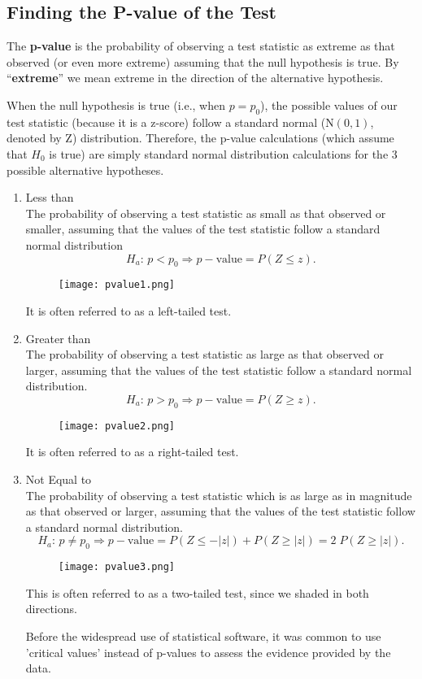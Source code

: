 \documentclass[10pt, a4paper]{article}
\begin{document}
\subsection{Finding the P-value of the Test}
The \textbf{p-value} is the probability of observing a test statistic as extreme as that observed (or even more extreme) assuming that the null hypothesis is true.
By ``\textbf{extreme}'' we mean extreme in the direction of the alternative hypothesis.\par
When the null hypothesis is true (i.e., when $p=p_0$), the possible values of our test statistic (because it is a z-score) follow a standard normal ($\mathrm{N}(0,1)$, denoted by Z) distribution. Therefore, the p-value calculations (which assume that $H_0$ is true) are simply standard normal distribution calculations for the 3 possible alternative hypotheses.
\begin{enumerate}
\item Less than\\
The probability of observing a test statistic as small as that observed or smaller, assuming that the values of the test statistic follow a standard normal distribution
\[
    H_a: \, p < p_0 \Rightarrow p - \text{value}=P(Z\leq z).
\]
\begin{figure}
    [h!]
    \centering
    \texttt{[image: pvalue1.png]}
\end{figure}
It is often referred to as a left-tailed test.
\item Greater than\\
The probability of observing a test statistic as large as that observed or larger, assuming that the values of the test statistic follow a standard normal distribution. 
\[
H_a: \, p > p_0 \Rightarrow p - \text{value}=P(Z\geq z).
\]
\begin{figure}
    [h!]
    \centering
    \texttt{[image: pvalue2.png]}
\end{figure}
It is often referred to as a right-tailed test.
\item Not Equal to \\
The probability of observing a test statistic which is as large as in magnitude as that observed or larger, assuming that the values of the test statistic follow a standard normal distribution.
\[
H_a: \, p \neq p_0 \Rightarrow p - \text{value}=P(Z\leq - |z|) + P(Z\geq |z|) = 2\; P(Z \geq |z|).
\]
\begin{figure}
    [h!]
    \centering
    \texttt{[image: pvalue3.png]}
\end{figure}
This is often referred to as a two-tailed test, since we shaded in both directions.\par
Before the widespread use of statistical software, it was common to use 'critical values' instead of p-values to assess the evidence provided by the data. 
\end{enumerate}
\end{document}
